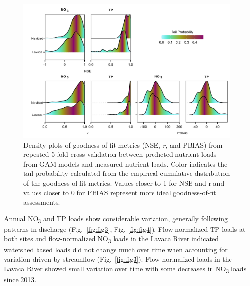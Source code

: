 \documentclass[fleqn,10pt,lineno]{wlpeerj} %
\begin{document}
\begin{figure}

{\centering \includegraphics[width=1\linewidth,]{Schramm-2023-08-PeerJ_files/figure-latex/fig2} 

}

\caption{Density plots of goodness-of-fit metrics (NSE, \textit{r}, and PBIAS) from repeated 5-fold cross validation between predicted nutrient loads from GAM models and measured nutrient loads. Color indicates the tail probability calculated from the empirical cumulative distribution of the goodness-of-fit metrics. Values closer to 1 for NSE and r and values closer to 0 for PBIAS represent more ideal goodness-of-fit assessments.}\label{fig:fig2}
\end{figure}

Annual NO\textsubscript{3} and TP loads show considerable variation,
generally following patterns in discharge (Fig.~\ref{fig:fig3}, Fig.
\ref{fig:fig4}). Flow-normalized TP loads at both sites and
flow-normalized NO\textsubscript{3} loads in the Lavaca River indicated
watershed based loads did not change much over time when accounting for
variation driven by streamflow (Fig.~\ref{fig:fig3}). Flow-normalized
loads in the Lavaca River showed small variation over time with some
decreases in NO\textsubscript{3} loads since 2013.
\end{document}
